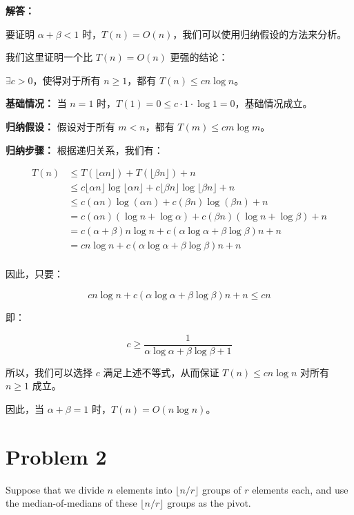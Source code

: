 ﻿\documentclass[12pt,a4paper]{article}
\begin{document}
\begin{answerbox}
\textbf{解答：}

要证明 $\alpha + \beta < 1$ 时，$T(n)=O(n)$，我们可以使用归纳假设的方法来分析。

我们这里证明一个比 $T(n)=O(n)$ 更强的结论：

$\exists c > 0$，使得对于所有 $n \geq 1$，都有 $T(n) \leq cn \log n $。

\textbf{基础情况：} 当 $n=1$ 时，$T(1)=0 \leq c \cdot 1 \cdot \log 1 = 0$，基础情况成立。

\textbf{归纳假设：} 假设对于所有 $m < n$，都有 $T(m) \leq cm \log m$。

\textbf{归纳步骤：} 根据递归关系，我们有：

$$
\begin{aligned}
T(n) &\leq T(\lfloor \alpha n \rfloor) + T(\lfloor \beta n \rfloor) + n \\
&\leq c \lfloor \alpha n \rfloor \log \lfloor \alpha n \rfloor + c \lfloor \beta n \rfloor \log \lfloor \beta n \rfloor + n \quad  \\
&\leq c (\alpha n) \log (\alpha n) + c (\beta n) \log (\beta n) + n \\
&= c (\alpha n) (\log n + \log \alpha) + c (\beta n) (\log n + \log \beta) + n \\
&= c(\alpha + \beta) n \log n + c (\alpha \log \alpha + \beta \log \beta) n + n \\
&= c n \log n + c (\alpha \log \alpha + \beta \log \beta) n + n \\
\end{aligned}
$$

因此，只要：

$$
c n \log n + c (\alpha \log \alpha + \beta \log \beta) n + n \leq cn
$$

即：

$$
c \geq \frac{1}{\alpha \log \alpha + \beta \log \beta + 1}
$$

所以，我们可以选择 $c$ 满足上述不等式，从而保证 $T(n) \leq cn \log n$ 对所有 $n \geq 1$ 成立。

因此，当 $\alpha + \beta = 1$ 时，$T(n)=O(n\log n)$。
\end{answerbox}

\section{Problem 2}

Suppose that we divide $n$ elements into $\lfloor n/r \rfloor$ groups of $r$ elements each, and use the median-of-medians of these $\lfloor n/r \rfloor$ groups as the pivot.
\end{document}
